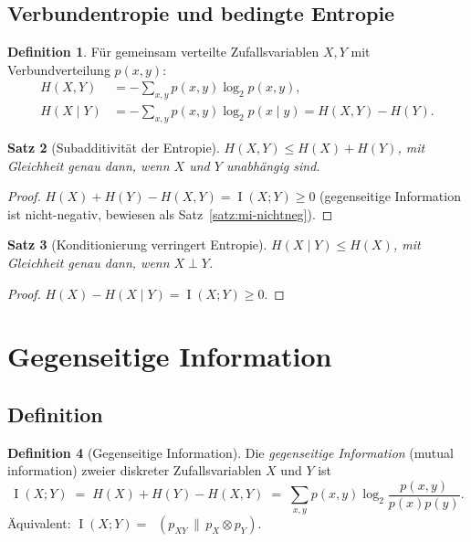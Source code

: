 \documentclass[12pt,a4paper]{amsart}
\newtheorem{theorem}{Satz}[section]
\theoremstyle{definition}
\newtheorem{definition}[theorem]{Definition}
\theoremstyle{remark}
\DeclareMathOperator{\MI}{I}
\DeclareMathOperator{\KL}{D_{KL}}
\begin{document}
\subsection{Verbundentropie und bedingte Entropie}

\begin{definition}
Für gemeinsam verteilte Zufallsvariablen $X, Y$ mit Verbundverteilung $p(x,y)$:
\begin{align}
  H(X,Y) &= -\sum_{x,y} p(x,y)\log_2 p(x,y), \\
  H(X \mid Y) &= -\sum_{x,y} p(x,y)\log_2 p(x \mid y) = H(X,Y) - H(Y).
\end{align}
\end{definition}

\begin{theorem}[Subadditivität der Entropie]\label{satz:subadditivitaet}
$H(X,Y) \leq H(X) + H(Y)$, mit Gleichheit genau dann, wenn $X$ und $Y$
unabhängig sind.
\end{theorem}
\begin{proof}
$H(X) + H(Y) - H(X,Y) = \MI(X;Y) \geq 0$
(gegenseitige Information ist nicht-negativ, bewiesen als Satz~\ref{satz:mi-nichtneg}).
\end{proof}

\begin{theorem}[Konditionierung verringert Entropie]\label{satz:kondred}
$H(X \mid Y) \leq H(X)$, mit Gleichheit genau dann, wenn $X \perp Y$.
\end{theorem}
\begin{proof}
$H(X) - H(X\mid Y) = \MI(X;Y) \geq 0$.
\end{proof}

\section{Gegenseitige Information}

\subsection{Definition}

\begin{definition}[Gegenseitige Information]
Die \emph{gegenseitige Information} (mutual information) zweier diskreter
Zufallsvariablen $X$ und $Y$ ist
\begin{equation}\label{eq:mi}
  \MI(X;Y) \;=\; H(X) + H(Y) - H(X,Y)
  \;=\; \sum_{x,y} p(x,y)\log_2\frac{p(x,y)}{p(x)p(y)}.
\end{equation}
Äquivalent: $\MI(X;Y) = \KL(p_{XY} \,\|\, p_X \otimes p_Y)$.
\end{definition}
\end{document}
